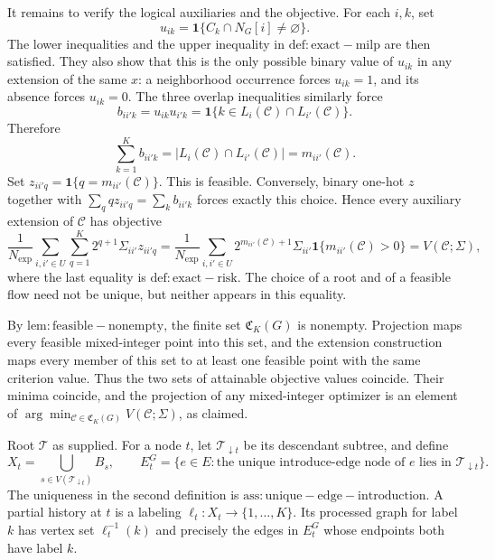 It remains to verify the logical auxiliaries and the objective.  For each \(i,k\), set
\[
 u_{ik}=\mathbf 1\{C_k\cap N_G[i]\ne\varnothing\}.
\]
The lower inequalities and the upper inequality in \(\mathrm{def:exact-milp}\) are then satisfied.  They also show that this is the only possible binary value of \(u_{ik}\) in any extension of the same \(x\): a neighborhood occurrence forces \(u_{ik}=1\), and its absence forces \(u_{ik}=0\).  The three overlap inequalities similarly force
\[
 b_{ii'k}=u_{ik}u_{i'k}
 =\mathbf 1\{k\in L_i(\mathcal C)\cap L_{i'}(\mathcal C)\}.
\]
Therefore
\[
 \sum_{k=1}^K b_{ii'k}=|L_i(\mathcal C)\cap L_{i'}(\mathcal C)|
 =m_{ii'}(\mathcal C).
\]
Set \(z_{ii'q}=\mathbf 1\{q=m_{ii'}(\mathcal C)\}\).  This is feasible.  Conversely, binary one-hot \(z\) together with \(\sum_qqz_{ii'q}=\sum_kb_{ii'k}\) forces exactly this choice.  Hence every auxiliary extension of \(\mathcal C\) has objective
\[
 \frac1{N_{\exp}}\sum_{i,i'\in U}\sum_{q=1}^K
 2^{q+1}\Sigma_{ii'}z_{ii'q}
 =\frac1{N_{\exp}}\sum_{i,i'\in U}
 2^{m_{ii'}(\mathcal C)+1}\Sigma_{ii'}
 \mathbf 1\{m_{ii'}(\mathcal C)>0\}
 =V(\mathcal C;\Sigma),
\]
where the last equality is \(\mathrm{def:exact-risk}\).  The choice of a root and of a feasible flow need not be unique, but neither appears in this equality.

By \(\mathrm{lem:feasible-nonempty}\), the finite set \(\mathfrak C_K(G)\) is nonempty.  Projection maps every feasible mixed-integer point into this set, and the extension construction maps every member of this set to at least one feasible point with the same criterion value.  Thus the two sets of attainable objective values coincide.  Their minima coincide, and the projection of any mixed-integer optimizer is an element of \(\arg\min_{\mathcal C\in\mathfrak C_K(G)}V(\mathcal C;\Sigma)\), as claimed.

Root \(\mathcal T\) as supplied.  For a node \(t\), let \(\mathcal T_{\downarrow t}\) be its descendant subtree, and define
\[
 X_t=\bigcup_{s\in V(\mathcal T_{\downarrow t})}B_s,
 \qquad
 E_t^G=\{e\in E:\text{the unique introduce-edge node of }e
                    \text{ lies in }\mathcal T_{\downarrow t}\}.
\]
The uniqueness in the second definition is \(\mathrm{ass:unique-edge-introduction}\).  A partial history at \(t\) is a labeling \(\ell_t:X_t\to\{1,\ldots,K\}\).  Its processed graph for label \(k\) has vertex set \(\ell_t^{-1}(k)\) and precisely the edges in \(E_t^G\) whose endpoints both have label \(k\).

